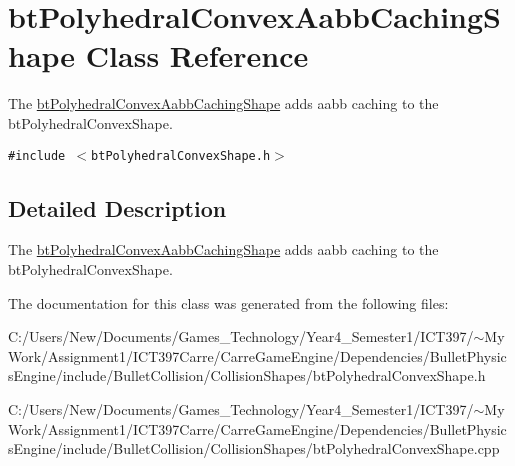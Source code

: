 \hypertarget{classbt_polyhedral_convex_aabb_caching_shape}{
\section{btPolyhedralConvexAabbCachingShape Class Reference}
\label{classbt_polyhedral_convex_aabb_caching_shape}
}
The \hyperlink{classbt_polyhedral_convex_aabb_caching_shape}{btPolyhedralConvexAabbCachingShape} adds aabb caching to the btPolyhedralConvexShape.  


{\tt \#include $<$btPolyhedralConvexShape.h$>$}



\subsection{Detailed Description}
The \hyperlink{classbt_polyhedral_convex_aabb_caching_shape}{btPolyhedralConvexAabbCachingShape} adds aabb caching to the btPolyhedralConvexShape. 

The documentation for this class was generated from the following files:\begin{CompactItemize}
\item 
C:/Users/New/Documents/Games\_\-Technology/Year4\_\-Semester1/ICT397/$\sim$My Work/Assignment1/ICT397Carre/CarreGameEngine/Dependencies/BulletPhysicsEngine/include/BulletCollision/CollisionShapes/btPolyhedralConvexShape.h\item 
C:/Users/New/Documents/Games\_\-Technology/Year4\_\-Semester1/ICT397/$\sim$My Work/Assignment1/ICT397Carre/CarreGameEngine/Dependencies/BulletPhysicsEngine/include/BulletCollision/CollisionShapes/btPolyhedralConvexShape.cpp\end{CompactItemize}
